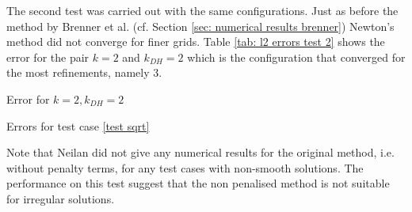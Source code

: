 
The second test was carried out with the same configurations. Just as before the method by Brenner et al. (cf. Section \ref{sec: numerical results brenner}) Newton's method did not converge for finer grids. 
Table \ref{tab: l2 errors test 2} shows the error for the pair $k=2$ and $k_{DH}=2$ which is the configuration that converged for the most refinements, namely 3.

\begin{table}[H]
		\centering
		\pgfplotstabletypeset[
		columns={iterations, l2error, h1error,N},
		every row 0 column 0/.style={set content=init},
		]{\MATwodegTwoTwo}
		\caption{Error for $k=2, k_{DH}=2$}
	\caption{Errors for test case \ref{test sqrt}}
	\label{tab: l2 errors test 2}
\end{table}
 
Note that Neilan did not give any numerical results for the original method, i.e. without penalty terms, for any test cases with non-smooth solutions. The performance on this test suggest that the non penalised method is not suitable for irregular solutions. 



